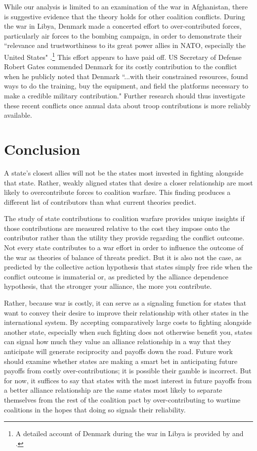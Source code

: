 \documentclass[12pt,letterpaper]{article}
\begin{document}
	While our analysis is limited to an examination of the war in Afghanistan, there is suggestive evidence that the theory holds for other coalition conflicts. During the war in Libya, Denmark made a concerted effort to over-contributed forces, particularly air forces to the bombing campaign, in order to demonstrate their ``relevance and trustworthiness to its great power allies in NATO, especially the United States" \citep[109]{jakobsen_goodnewslibya_2012}.\footnote{A detailed account of Denmark during the war in Libya is provided by \citet{dicke_natoburdensharinglibya_2013} and \citet{jakobsen_prestigeseekingsmallstates_2018}.} This effort appears to have paid off. US Secretary of Defense Robert Gates \citet{gates_securitydefenseagenda_2011} commended Denmark for its costly contribution to the conflict when he publicly noted that Denmark ``...with their constrained resources, found ways to do the training, buy the equipment, and field the platforms necessary to make a credible military contribution." Further research should thus investigate these recent conflicts once annual data about troop contributions is more reliably available.

\section{Conclusion}
	A state's closest allies will not be the states most invested in fighting alongside that state. Rather, weakly aligned states that desire a closer relationship are most likely to overcontribute forces to coalition warfare. This finding produces a different list of contributors than what current theories predict.
	
	The study of state contributions to coalition warfare provides unique insights if those contributions are measured relative to the cost they impose onto the contributor rather than the utility they provide regarding the conflict outcome. Not every state contributes to a war effort in order to influence the outcome of the war as theories of balance of threats predict. But it is also not the case, as predicted by the collective action hypothesis that states simply free ride when the conflict outcome is immaterial or, as predicted by the alliance dependence hypothesis, that the stronger your alliance, the more you contribute.

	Rather, because war is costly, it can serve as a signaling function for states that want to convey their desire to improve their relationship with other states in the international system. By accepting comparatively large costs to fighting alongside another state, especially when such fighting does not otherwise benefit you, states can signal how much they value an alliance relationship in a way that they anticipate will generate reciprocity and payoffs down the road. Future work should examine whether states are making a smart bet in anticipating future payoffs from costly over-contributions; it is possible their gamble is incorrect. But for now, it suffices to say that states with the most interest in future payoffs from a better alliance relationship are the same states most likely to separate themselves from the rest of the coalition pact by over-contributing to wartime coalitions in the hopes that doing so signals their reliability.



\end{document}
